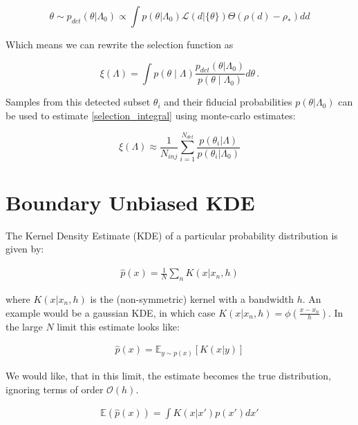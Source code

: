 \documentclass[twocolumn,usenames,dvipsnames,linenumbers]{aastex631}
\begin{document}
\begin{equation}
	\theta \sim p_{det}(\theta | \Lambda_0) \propto \int p(\theta | \Lambda_0)\mathcal{L}(d | \{\theta\})\Theta\left(\rho(d)-\rho_*\right) dd
\end{equation}

Which means we can rewrite the selection function as

\begin{equation}
	\xi(\Lambda) =  \int p(\theta \mid \Lambda)  \frac{p_{det}(\theta | \Lambda_0)}{p(\theta \mid \Lambda_0)} d \theta\, .
\end{equation}

Samples from this detected subset $\theta_i$ and their fiducial probabilities $p(\theta | \Lambda_0)$ can be used to estimate \eqref{selection_integral} using monte-carlo estimates:

\begin{equation}
	\xi(\Lambda) \approx \frac{1}{N_{inj}} \sum_{i=1}^{N_{det}} \frac{p(\theta_i | \Lambda)}{p(\theta_i | \Lambda_0)}
\end{equation}

\section{Boundary Unbiased KDE}
\label{sec:BoundaryKDE}
The Kernel Density Estimate (KDE) of a particular probability distribution is given by:

\begin{equation}
\begin{aligned}
	\hat{p}(x) = \frac{1}{N}\sum_n K(x | x_n , h)
\end{aligned}
\end{equation}

where $K(x | x_n, h)$ is the (non-symmetric) kernel with a bandwidth $h$. An example would be a gaussian KDE, in which case $K(x | x_n, h) = \phi(\frac{x-x_n}{h})$. In the large $N$ limit this estimate looks like:

\begin{equation}
\begin{aligned}
	\hat{p}(x) = \mathbb{E}_{y \sim p(x)}[K(x|y)]
\end{aligned}
\end{equation}

We would like, that in this limit, the estimate becomes the true distribution, ignoring terms of order $\mathcal{O}(h)$.

\begin{equation}
\begin{aligned}
	\mathbb{E}(\hat{p}(x)) = \int K(x | x')p(x')dx'
\end{aligned}
\end{equation}
	
\end{document}
